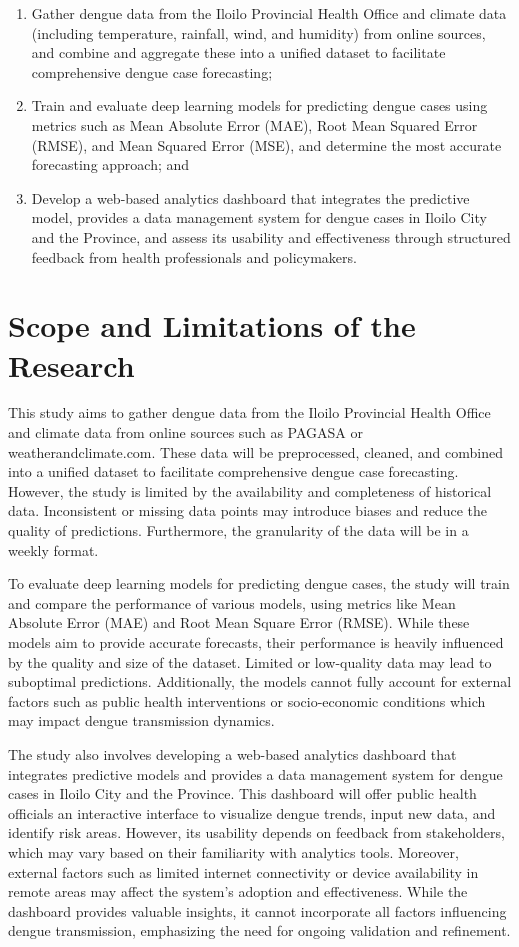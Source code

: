 \begin{enumerate}
	\item Gather dengue data from the Iloilo Provincial Health Office and climate data (including temperature, rainfall, wind, and humidity) from online sources, and combine and aggregate these into a unified dataset to facilitate comprehensive dengue case forecasting;
	\item Train and evaluate deep learning models for predicting dengue cases using metrics such as Mean Absolute Error (MAE), Root Mean Squared Error (RMSE), and Mean Squared Error (MSE), and determine the most accurate forecasting approach; and
	\item Develop a web-based analytics dashboard that integrates the predictive model, provides a data management system for dengue cases in Iloilo City and the Province, and assess its usability and effectiveness through structured feedback from health professionals and policymakers.
\end{enumerate}


\section{Scope and Limitations of the Research}
\label{sec:scopelimitations}

This study aims to gather dengue data from the Iloilo Provincial Health Office and climate data from online sources such as PAGASA or weatherandclimate.com. These data will be preprocessed, cleaned, and combined into a unified dataset to facilitate comprehensive dengue case forecasting. However, the study is limited by the availability and completeness of historical data. Inconsistent or missing data points may introduce biases and reduce the quality of predictions. Furthermore, the granularity of the data will be in a weekly format.

To evaluate deep learning models for predicting dengue cases, the study will train and compare the performance of various models, using metrics like Mean Absolute Error (MAE) and Root Mean Square Error (RMSE). While these models aim to provide accurate forecasts, their performance is heavily influenced by the quality and size of the dataset. Limited or low-quality data may lead to suboptimal predictions. Additionally, the models cannot fully account for external factors such as public health interventions or socio-economic conditions which may impact dengue transmission dynamics.

The study also involves developing a web-based analytics dashboard that integrates predictive models and provides a data management system for dengue cases in Iloilo City and the Province. This dashboard will offer public health officials an interactive interface to visualize dengue trends, input new data, and identify risk areas. However, its usability depends on feedback from stakeholders, which may vary based on their familiarity with analytics tools. Moreover, external factors such as limited internet connectivity or device availability in remote areas may affect the system's adoption and effectiveness. While the dashboard provides valuable insights, it cannot incorporate all factors influencing dengue transmission, emphasizing the need for ongoing validation and refinement.


